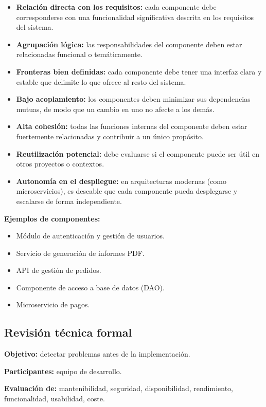 \begin{itemize}

    \item \textbf{Relación directa con los requisitos:} cada componente debe corresponderse con una funcionalidad significativa descrita en los requisitos del sistema.

    \item \textbf{Agrupación lógica:} las responsabilidades del componente deben estar relacionadas funcional o temáticamente.

    \item \textbf{Fronteras bien definidas:} cada componente debe tener una interfaz clara y estable que delimite lo que ofrece al resto del sistema.

    \item \textbf{Bajo acoplamiento:} los componentes deben minimizar sus dependencias mutuas, de modo que un cambio en uno no afecte a los demás.

    \item \textbf{Alta cohesión:} todas las funciones internas del componente deben estar fuertemente relacionadas y contribuir a un único propósito.

    \item \textbf{Reutilización potencial:} debe evaluarse si el componente puede ser útil en otros proyectos o contextos.

    \item \textbf{Autonomía en el despliegue:} en arquitecturas modernas (como microservicios), es deseable que cada componente pueda desplegarse y escalarse de forma independiente.

\end{itemize}


\textbf{Ejemplos de componentes:}

\begin{itemize}

    \item Módulo de autenticación y gestión de usuarios.

    \item Servicio de generación de informes PDF\@.

    \item API de gestión de pedidos.

    \item Componente de acceso a base de datos (DAO).

    \item Microservicio de pagos.

\end{itemize}




\subsection{Revisión técnica formal}\label{subsec:revision-tecnica-formal}

\textbf{Objetivo:} detectar problemas antes de la implementación.

\textbf{Participantes:} equipo de desarrollo.

\textbf{Evaluación de:} mantenibilidad, seguridad, disponibilidad, rendimiento, funcionalidad, usabilidad, coste.